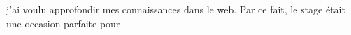 \documentclass[a4paper, 11pt, french]{report}
\begin{document}
                                                                                                                                   j'ai
                                                                                                                                   voulu
                                                                                                                                   approfondir
                                                                                                                                   mes
                                                                                                                                   connaissances
                                                                                                                                   dans
                                                                                                                                   le
                                                                                                                                   web.
                                                                                                                                   \newline
                                                                                                                                   Par
                                                                                                                                   ce
                                                                                                                                   fait,
                                                                                                                                   le
                                                                                                                                   stage
                                                                                                                                   était
                                                                                                                                   une
                                                                                                                                   occasion
                                                                                                                                   parfaite
                                                                                                                                   pour
\end{document}
